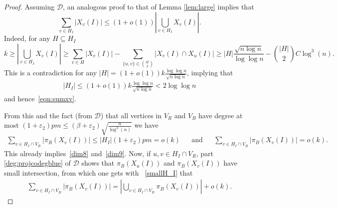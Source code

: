 \documentclass{article}
\begin{document}
\begin{proof}
	Assuming $\mathcal{D}$, an analogous proof to that of Lemma \ref{lem:large} implies that \begin{equation}
	\sum_{v \in H_I} |X_v(I)| \leq (1+o(1)) \left| \bigcup_{v \in H_I} X_v(I)\right|.
	\label{eqn:sumxv}\end{equation} 
    Indeed, for any $H \subseteq H_I$ 
    \[
   k \geq \left| \bigcup_{v \in H_I} X_v(I)\right| \geq \sum_{v \in H} |X_v(I)| - \sum_{\{u, v\} \in {H\choose 2}} |X_v(I) \cap X_u(I)| \geq |H| \frac{\sqrt{n \log n}}{\log \log n} - {|H| \choose 2} C\log^3 (n).  
    \]
This is a contradiction for any $|H| = (1+o(1)) k \frac{\log \log n}{\sqrt{ n \log n}}$, implying that 
\begin{align}\label{smallH_I}
    |H_I| \leq (1+o(1)) k \frac{\log \log n}{\sqrt{ n \log n}} < 2\log \log n
\end{align} 
and hence~\eqref{eqn:sumxv}.      
  
  From this and the fact (from $\mathcal{D}$) that all vertices in $V_R$ and $V_B$ have degree at most $(1+\varepsilon_2)p{m} \leq  (\beta+\varepsilon_2)\sqrt{\frac{n}{\log^3 (n)}}$ we have   
  	\begin{align} 
		\sum_{v \in H_{I} \cap V_R} |\pi_R(X_v(I))| \leq |H_I|(1+\varepsilon_2)p{m} = o(k) && \text{and} && 	\sum_{v \in H_{I} \cap V_B} |\pi_B(X_v(I))| = o(k). \label{eq:projbound}
	\end{align} 
This already implies~\eqref{dim8} and~\eqref{dim9}.
    Now, if $u, v \in H_I \cap V_R$, part \eqref{deg:projcodegblue} of $\mathcal{D}$ shows that $\pi_B(X_u(I))$ and $\pi_B(X_v(I))$ have small intersection, from which one gets with 
    ~\eqref{smallH_I} that
    \begin{align*}
    \sum_{v \in H_I\cap V_R} |\pi_{B}(X_v(I))| = \left| \bigcup_{v \in H_I\cap V_R} \pi_B(X_v(I))\right|+o(k).
    \end{align*} 


\end{proof}
\end{document}
